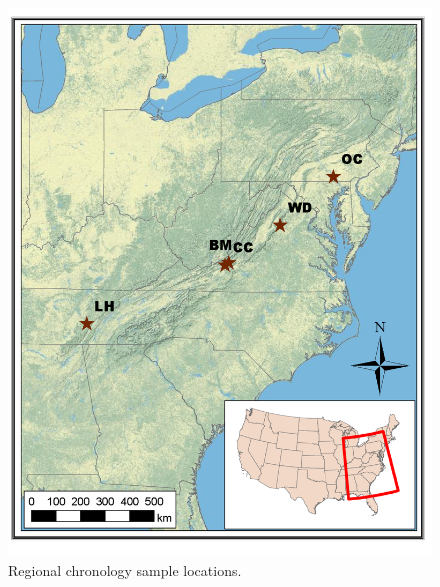 
\begin{figure}
\centering
\includegraphics[width=5in]{figures/NewClimateNADEF.png}
\caption{Regional chronology sample locations.}
\label{fig:map}
\end{figure}

